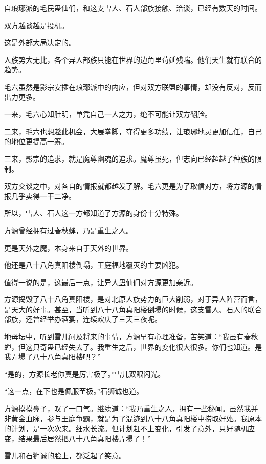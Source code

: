
\begin{this_body}

自琅琊派的毛民蛊仙们，和这支雪人、石人部族接触、洽谈，已经有数天的时间。

双方越谈越是投机。

这是外部大局决定的。

人族势大无比，各个异人部族只能在世界的边角里苟延残喘。他们天生就有联合的趋势。

毛六虽然是影宗安插在琅琊派中的内应，但对双方联盟的事情，却没有反对，反而出力更多。

一来，毛六心知肚明，单凭自己一人之力，绝不可能让双方翻脸。

二来，毛六也想趁此机会，大展拳脚，夺得更多功绩，让琅琊地灵更加信任，自己的地位更提高一筹。

三来，影宗的追求，就是魔尊幽魂的追求。魔尊虽死，但志向已经超越了种族的限制。

双方交谈之中，对各自的情报就都越发了解。毛六更是为了取信对方，将方源的情报几乎卖得一干二净。

所以，雪人、石人这一方都知道了方源的身份十分特殊。

方源曾经拥有过春秋蝉，乃是重生之人。

更是天外之魔，本身来自于天外的世界。

他还是八十八角真阳楼倒塌，王庭福地覆灭的主要凶犯。

值得一说的是，这最后一点，让异人蛊仙们对方源更加亲近。

方源捣毁了八十八角真阳楼，是对北原人族势力的巨大削弱，对于异人阵营而言，是天大的好事。甚至，当听到八十八角真阳楼倒塌的时候，这支雪人、石人的联合部族，还曾经举办酒宴，连续欢庆了三天三夜呢。

地母坛中，听到雪儿问及将来的事情，方源早有心理准备，苦笑道：“我虽有春秋蝉，但这只奇蛊已经失去了。我重生之后，世界的变化很大很多。你们也知道。是我弄塌了八十八角真阳楼吧？”

“是的，方源长老你真是厉害极了。”雪儿双眼闪光。

“这一点，在下也是佩服至极。”石狮诚也道。

方源摸摸鼻子，叹了一口气。继续道：“我乃重生之人，拥有一些秘闻。虽然我并非黄金血脉，参与王庭争霸，就是为了混迹到八十八角真阳楼中捞取好处。我原本的计划，是一次次来。细水长流。但计划赶不上变化，引发了意外，只好随机应变，结果最后居然把八十八角真阳楼弄塌了！”

雪儿和石狮诚的脸上，都泛起了笑意。


\end{this_body}
